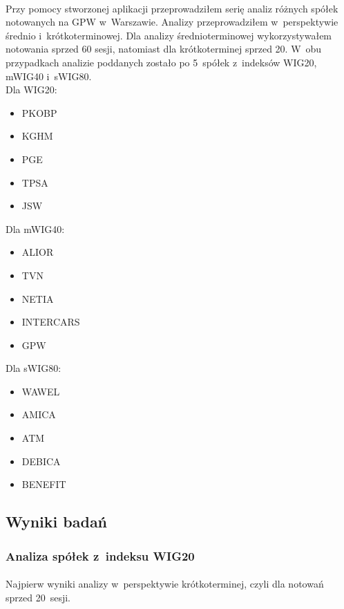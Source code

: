 \paragraph{}
Przy pomocy stworzonej aplikacji przeprowadziłem serię analiz różnych spółek notowanych na GPW w~Warszawie. Analizy przeprowadziłem w~perspektywie średnio i~krótkoterminowej. Dla analizy średnioterminowej wykorzystywałem notowania sprzed 60 sesji, natomiast dla krótkoterminej sprzed 20. W~obu przypadkach analizie poddanych zostało po 5~spółek z~indeksów WIG20, mWIG40 i~sWIG80.\\
Dla WIG20:
\begin{itemize}
	\item PKOBP
	\item KGHM
	\item PGE
	\item TPSA
	\item JSW
\end{itemize}

Dla mWIG40:
\begin{itemize}
	\item ALIOR
	\item TVN
	\item NETIA
	\item INTERCARS
	\item GPW
\end{itemize}

Dla sWIG80:
\begin{itemize}
	\item WAWEL
	\item AMICA
	\item ATM
	\item DEBICA
	\item BENEFIT
\end{itemize}

\subsection{Wyniki badań}

\subsubsection{Analiza spółek z~indeksu WIG20}

\paragraph{}
Najpierw wyniki analizy w~perspektywie krótkoterminej, czyli dla notowań sprzed 20~sesji.

